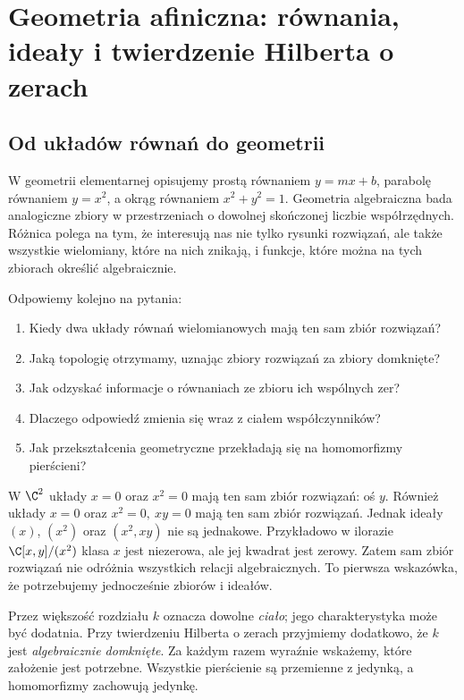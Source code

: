 \chapter{Geometria afiniczna: równania, ideały i twierdzenie Hilberta o zerach}
\label{ch:afiniczna}

\providecommand{\atlasref}[2]{#2}

\section{Od układów równań do geometrii}

W geometrii elementarnej opisujemy prostą równaniem $y=mx+b$, parabolę
równaniem $y=x^2$, a okrąg równaniem $x^2+y^2=1$. Geometria algebraiczna
bada analogiczne zbiory w przestrzeniach o dowolnej skończonej liczbie
współrzędnych. Różnica polega na tym, że interesują nas nie tylko
rysunki rozwiązań, ale także wszystkie wielomiany, które na nich znikają,
i funkcje, które można na tych zbiorach określić algebraicznie.

Odpowiemy kolejno na pytania:
\begin{enumerate}[label=\arabic*)]
\item Kiedy dwa układy równań wielomianowych mają ten sam zbiór rozwiązań?
\item Jaką topologię otrzymamy, uznając zbiory rozwiązań za zbiory domknięte?
\item Jak odzyskać informacje o równaniach ze zbioru ich wspólnych zer?
\item Dlaczego odpowiedź zmienia się wraz z ciałem współczynników?
\item Jak przekształcenia geometryczne przekładają się na homomorfizmy pierścieni?
\end{enumerate}

\begin{przyklad}
W $\C^2$ układy $x=0$ oraz $x^2=0$ mają ten sam zbiór
rozwiązań: oś $y$. Również układy $x=0$ oraz $x^2=0,\ xy=0$
mają ten sam zbiór rozwiązań. Jednak ideały $(x)$, $(x^2)$ oraz
$(x^2,xy)$ nie są jednakowe. Przykładowo w ilorazie
$\C[x,y]/(x^2)$ klasa $x$ jest niezerowa, ale jej kwadrat jest zerowy.
Zatem sam zbiór rozwiązań nie odróżnia wszystkich relacji algebraicznych.
To pierwsza wskazówka, że potrzebujemy jednocześnie zbiorów i ideałów.
\end{przyklad}

\begin{uwaga}
Przez większość rozdziału $k$ oznacza dowolne \emph{ciało}; jego
charakterystyka może być dodatnia. Przy twierdzeniu Hilberta o zerach
przyjmiemy dodatkowo, że $k$ jest \emph{algebraicznie domknięte}.
Za każdym razem wyraźnie wskażemy, które założenie jest potrzebne.
Wszystkie pierścienie są przemienne z jedynką, a homomorfizmy zachowują jedynkę.
\end{uwaga}

